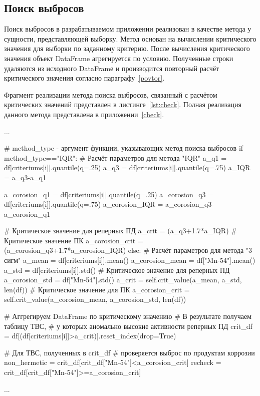 \subsection{Поиск выбросов}

Поиск выбросов в разрабатываемом приложении реализован в качестве метода у сущности, представляющей выборку. Метод основан на вычислении критического значения для выборки по заданному критерию. После вычисления критического значения объект DataFrame агрегируется по условию. Полученные строки удаляются из исходного DataFramе и производится повторный расчёт критического значения согласно параграфу~\ref{povtor}. 

Фрагмент реализации метода поиска выбросов, связанный с расчётом критических значений представлен в листинге~\ref{lst:check}. Полная реализация данного метода представлена в приложении~\ref{check}.

\begin{flushleft}
 \label{lst:check}
\begin{MyCodes}
...

# method_type - аргумент функции, указывающих метод поиска выбросов
if method_type=="IQR":
	# Расчёт параметров для метода "IQR"
	a_q1 = df[criteriums[i]].quantile(q=.25)
	a_q3 = df[criteriums[i]].quantile(q=.75)
	a_IQR = a_q3-a_q1
	
	a_corosion_q1 = df[criteriums[i]].quantile(q=.25)
	a_corosion_q3 = df[criteriums[i]].quantile(q=.75)
	a_corosion_IQR = a_corosion_q3-a_corosion_q1
	
	# Критическое значение для реперных ПД
	a_crit = (a_q3+1.7*a_IQR) 
	# Критическое значение ПК
	a_corosion_crit = (a_corosion_q3+1.7*a_corosion_IQR) 
else:
	# Расчёт параметров для метода "3 сигм"
	a_mean = df[criteriums[i]].mean()
	a_corosion_mean = df["Mn-54"].mean()
	a_std = df[criteriums[i]].std()
	# Критическое значение для реперных ПД
	a_corosion_std = df["Mn-54"].std() 
	a_crit = self.crit_value(a_mean, a_std, len(df))
	 # Критическое значение для ПК
	a_corosion_crit = self.crit_value(a_corosion_mean,
		a_corosion_std, len(df))

# Аггрегируем DataFrame по критическому значению
# В результате получаем таблицу ТВС, 
# у которых аномально высокие активности реперных ПД
crit_df = df[(df[criteriums[i]]>a_crit)].reset_index(drop=True)

# Для ТВС, полученных в crit_df
# проверяется выброс по продуктам коррозии
non_hermetic = crit_df[crit_df["Mn-54"]<a_corosion_crit]
recheck = crit_df[crit_df["Mn-54"]>=a_corosion_crit]

...
\end{MyCodes}
\end{flushleft}

